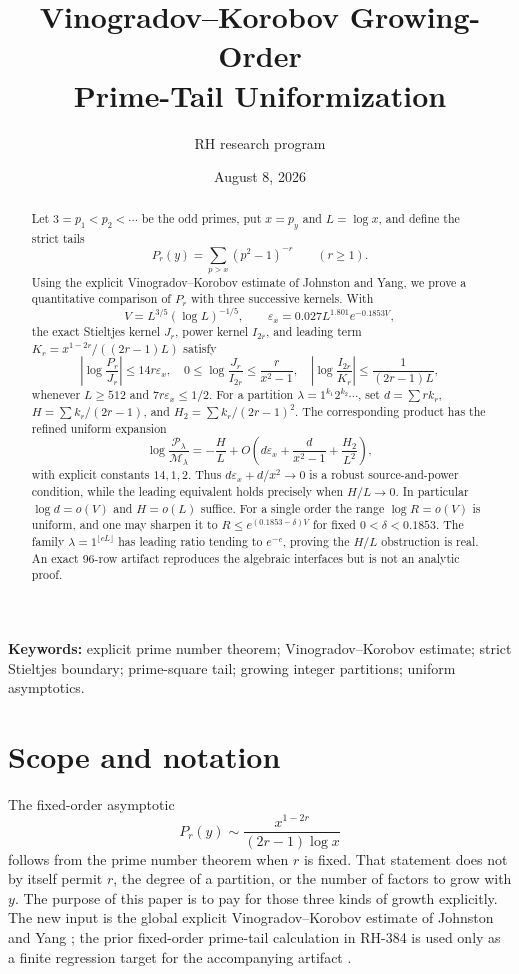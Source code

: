 \documentclass[11pt]{article}
\title{Vinogradov--Korobov Growing-Order\\
Prime-Tail Uniformization}
\author{RH research program}
\date{August 8, 2026}
\theoremstyle{definition}
\theoremstyle{remark}
\newcommand{\eps}{\varepsilon}
\newcommand{\cP}{\mathcal P}
\newcommand{\cM}{\mathcal M}
\begin{document}
\maketitle

\begin{abstract}
Let $3=p_1<p_2<\cdots$ be the odd primes, put $x=p_y$ and
$L=\log x$, and define the strict tails
\[
 P_r(y)=\sum_{p>x}(p^2-1)^{-r}\qquad(r\ge1).
\]
Using the explicit Vinogradov--Korobov estimate of Johnston and Yang, we
prove a quantitative comparison of $P_r$ with three successive kernels.
With
\[
 V=L^{3/5}(\log L)^{-1/5},\qquad
 \eps_x=0.027L^{1.801}e^{-0.1853V},
\]
the exact Stieltjes kernel $J_r$, power kernel $I_{2r}$, and leading term
$K_r=x^{1-2r}/((2r-1)L)$ satisfy
\[
 \left|\log\frac{P_r}{J_r}\right|\le14r\eps_x,
 \quad
 0\le\log\frac{J_r}{I_{2r}}\le\frac{r}{x^2-1},
 \quad
 \left|\log\frac{I_{2r}}{K_r}\right|
 \le\frac{1}{(2r-1)L},
\]
whenever $L\ge512$ and $7r\eps_x\le1/2$.
For a partition $\lambda=1^{k_1}2^{k_2}\cdots$, set
$d=\sum rk_r$, $H=\sum k_r/(2r-1)$, and
$H_2=\sum k_r/(2r-1)^2$.  The corresponding product has the refined
uniform expansion
\[
 \log\frac{\cP_\lambda}{\cM_\lambda}
 =-\frac{H}{L}
 +O\!\left(d\eps_x+\frac{d}{x^2-1}+\frac{H_2}{L^2}\right),
\]
with explicit constants $14,1,2$.  Thus
$d\eps_x+d/x^2\to0$ is a robust source-and-power condition, while the
leading equivalent holds precisely when $H/L\to0$.  In particular
$\log d=o(V)$ and $H=o(L)$ suffice.  For a single order the range
$\log R=o(V)$ is uniform, and one may sharpen it to
$R\le e^{(0.1853-\delta)V}$ for fixed $0<\delta<0.1853$.
The family $\lambda=1^{\lfloor cL\rfloor}$ has leading ratio tending to
$e^{-c}$, proving the $H/L$ obstruction is real.  An exact 96-row artifact
reproduces the algebraic interfaces but is not an analytic proof.
\end{abstract}

\noindent\textbf{Keywords:} explicit prime number theorem;
Vinogradov--Korobov estimate; strict Stieltjes boundary; prime-square tail;
growing integer partitions; uniform asymptotics.

\section{Scope and notation}

The fixed-order asymptotic
\[
 P_r(y)\sim\frac{x^{1-2r}}{(2r-1)\log x}
\]
follows from the prime number theorem when $r$ is fixed.  That statement
does not by itself permit $r$, the degree of a partition, or the number of
factors to grow with $y$.  The purpose of this paper is to pay for those
three kinds of growth explicitly.  The new input is the global explicit
Vinogradov--Korobov estimate of Johnston and Yang
\citep[Theorem~1.4, equation~(1.8)]{JohnstonYang2023}; the prior fixed-order
prime-tail calculation in RH-384 is used only as a finite regression target
for the accompanying artifact \citep{RH384}.
\end{document}
